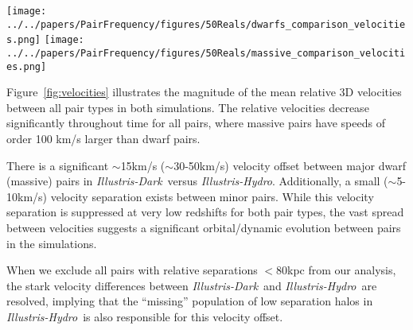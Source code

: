 \documentclass[twocolumn]{aastex63}
\newcommand\ID{\textit{Illustris-Dark}}
\newcommand\IH{\textit{Illustris-Hydro}}
\newcommand{\kc}[1]{\textcolor{mypink}{\textbf{#1}} }
\begin{document}
\begin{figure*}
  \centering
  \texttt{[image: ../../papers/PairFrequency/figures/50Reals/dwarfs\_comparison\_velocities.png]}
  \texttt{[image: ../../papers/PairFrequency/figures/50Reals/massive\_comparison\_velocities.png]}
  \caption{\label{fig:velocities}The mean magnitude of the relative 3D velocity between primary and secondary subhalos in \textit{Illustris-Dark} and \textit{Illustris-Hydro} as a function of time for major (left) and minor (right) pairs. The relative velocities decrease significantly throughout time for all dwarf and massive galaxy pairs. Note that the relative velocities are systematically higher for all pairs in \textit{Illustris-Hydro} (by 15-50 km/s), though the differences are smaller for minor pairs and at low redshift. This discrepancy is likely related to the similar discrepancy seen in the separations (Fig.~\ref{fig:separations}).%
}
\end{figure*}

Figure~\ref{fig:velocities} illustrates the magnitude of the mean relative 3D velocities between all pair types in both simulations. The relative velocities decrease significantly throughout time for all pairs, where massive pairs have speeds of order 100 km/s larger than dwarf pairs. 

There is a significant $\sim$15km/s ($\sim$30-50km/s) velocity offset between major dwarf (massive) pairs in \ID\ versus \IH. Additionally, a small ($\sim$5-10km/s) velocity separation exists between minor pairs. While this velocity separation is suppressed at very low redshifts for both pair types, the vast spread between velocities suggests a significant orbital/dynamic evolution between pairs in the simulations. 

When we exclude all pairs with relative separations $<80$kpc from our analysis, the stark velocity differences between \ID\ and \IH\ are resolved, implying that the ``missing'' population of low separation halos in \IH\ is also responsible for this velocity offset. 
\end{document}

